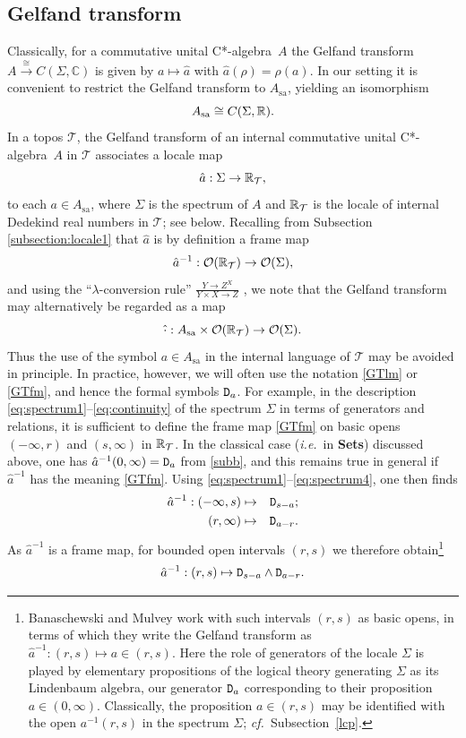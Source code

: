 \documentclass[11pt]{article}
\newcommand{\beq}{\begin{equation}}
\newcommand{\eeq}{\end{equation}}
\newcommand{\Sets}{\mbox{\textbf{Sets}}}
\newcommand{\ca}{C*-algebra} \newcommand{\jba}{JB-algebra}
\newcommand{\raw}{\rightarrow} \newcommand{\rat}{\mapsto}
\newcommand{\inv}{^{-1}}
\newcommand{\er}{\eqref}
\newcommand{\lm}{\lambda} \newcommand{\Lm}{\Lambda}
\newcommand{\rh}{\rho} \newcommand{\sg}{\sigma}
\newcommand{\Sg}{\Sigma} \newcommand{\ta}{\tau} \newcommand{\ph}{\phi}
\newcommand{\CO}{{\mathcal O}} \newcommand{\CP}{{\mathcal P}}
\newcommand{\CT}{{\mathcal T}} \newcommand{\CV}{{\mathcal V}}
\newcommand{\C}{{\mathbb C}} \newcommand{\D}{{\mathbb D}}
\newcommand{\sa}{\ensuremath{_{\mathrm{sa}}}}
\newcommand{\prop}[1]{\ensuremath{\mbox{\texttt{#1}}}}
\newcommand{\ie}{\textit{i.e.}}
\begin{document}
\subsection{Gelfand transform}\label{sec:GT}

Classically, for a commutative unital \ca\ $A$ the Gelfand transform
$A\stackrel{\cong}{\raw} C(\Sigma,\C)$
 is given by $a\mapsto \hat{a}$ with $\hat{a}(\rh)=\rh(a)$. In our setting it is
 convenient to restrict the Gelfand transform to $A\sa$, yielding an isomorphism
 \beq
 A\sa\cong C(\Sg,\R)  \label{GTisoR}.
 \eeq
 In a topos $\CT$,
 the Gelfand transform of an internal commutative unital \ca\ ${A}$ in $\CT$
associates a locale map
\beq \hat{a}:\Sg\raw \R_{\CT},\label{GTlm}\eeq
 to each $a\in{A\sa}$, where
$\Sg$ is the spectrum of ${A}$ and
 $\R_{\CT}$ is the locale of internal Dedekind real numbers in
$\CT$; see below. Recalling from Subsection \ref{subsection:locale1} that
 $\hat{a}$ is by definition a frame map
 \beq \hat{a}\inv: \CO(\R_{\CT})\raw\CO(\Sg), \label{GTfm}\eeq
 and using the ``$\lm$-conversion rule'' $\frac{Y\raw Z^X}{Y\times X\raw Z}$
  \cite[\S I.6]{maclanemoerdijk92},
 we note that  the Gelfand transform may alternatively  be regarded as a map
\beq
\hat{\cdot}: A\sa\times \CO(\R_{\CT})\raw \CO(\Sg).\label{GTlc}\eeq
 Thus
 the use of the symbol $a\in A\sa$ in the internal language of $\CT$ may be
avoided in principle.
 In practice, however, we will often use the notation \er{GTlm} or \er{GTfm},
and hence the formal symbols $\prop{D}_a$.
For example, in the description \er{eq:spectrum1}--\er{eq:continuity} of
the spectrum $\Sg$ in terms of generators and relations, it is
sufficient to define the frame map \er{GTfm} on basic opens $(-\infty,r)$ and
$(s,\infty)$ in $\R_{\CT}$. In the classical case (\ie\ in \Sets) discussed above,
one has
$\hat{a}\inv(0,\infty)=\prop{D}_a$ from \er{subb}, and this remains true in
general if $\hat{a}\inv$ has the meaning \er{GTfm}.
 Using \er{eq:spectrum1}--\er{eq:spectrum4}, one then finds
\begin{eqnarray}
\hat{a}\inv : (-\infty,s) &\mapsto&  \prop{D}_{s-a};\label{GT0}\\
 (r,\infty) &\mapsto & \prop{D}_{a-r}. \label{GT}
\end{eqnarray}
As $\hat{a}\inv$ is a frame map, for bounded open intervals $(r,s)$
 we therefore obtain\footnote{Banaschewski and Mulvey
\cite{banaschewskimulvey06} work with such intervals $(r,s)$ as basic opens, in
terms
of which they write the Gelfand transform as $\hat{a}\inv : (r,s) \mapsto a\in
(r,s)$. Here the role of generators of the locale $\Sg$ is played by elementary
propositions of the logical theory generating $\Sg$ as its Lindenbaum algebra,
our generator $\prop{D}_a$
corresponding to their proposition $a\in(0,\infty)$. Classically,  the
proposition
$a\in (r,s)$ may be identified with the open
$a\inv(r,s)$ in the spectrum $\Sg$; {\it cf.}\ Subsection~\ref{lcp}.}
\beq \hat{a}\inv : (r,s) \mapsto \prop{D}_{s-a}\wedge \prop{D}_{a-r}.\label{GT2}
\eeq
\end{document}
